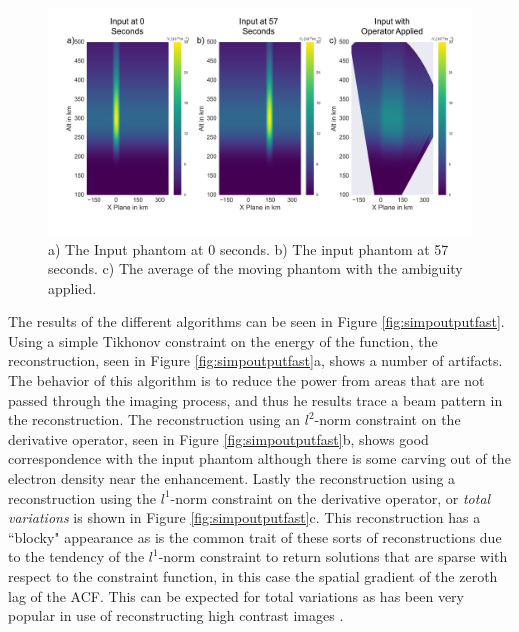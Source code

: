 \begin{figure}[!ht]
\centering
\includegraphics[width=6in]{Simpleinputfast}
\caption{a) The Input phantom at 0 seconds. b) The input phantom at 57 seconds. c) The average of the moving phantom with the ambiguity applied.}
\label{fig:simpinputfast}
\end{figure}

The results of the different algorithms can be seen in Figure \ref{fig:simpoutputfast}. Using a simple Tikhonov constraint on the energy of the function, the reconstruction, seen in Figure \ref{fig:simpoutputfast}a, shows a number of artifacts. The behavior of this algorithm is to reduce the power from areas that are not passed through the imaging process, and thus he results trace a beam pattern in the reconstruction. The reconstruction using an $l^2$-norm constraint on the derivative operator, seen in Figure \ref{fig:simpoutputfast}b, shows good correspondence with the input phantom although there is some carving out of the electron density near the enhancement. Lastly the reconstruction using a reconstruction using the $l^1$-norm constraint on the derivative operator, or \textit{total variations} is shown in Figure \ref{fig:simpoutputfast}c. This reconstruction has a ``blocky" appearance as is the common trait of these sorts of reconstructions due to the tendency of the $l^1$-norm constraint to return solutions that are sparse with respect to the constraint function, in this case the spatial gradient of the zeroth lag of the ACF. This can be expected for total variations as has been very popular in use of reconstructing high contrast images \citep{Karl:2005jy}. 

